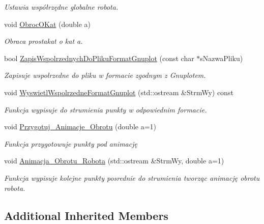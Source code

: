 \begin{DoxyCompactItemize}
\begin{DoxyCompactList}\small\item\em Ustawia współrzędne globalne robota. \end{DoxyCompactList}\item 
void \hyperlink{class_robot_a4d5ca83fe9dee72eddd8c6df97a0e10d}{Obroc\+O\+Kat} (double a)
\begin{DoxyCompactList}\small\item\em Obraca prostakat o kat a. \end{DoxyCompactList}\item 
bool \hyperlink{class_robot_a8e9a1014f600141e9a9514d6622b3394}{Zapis\+Wspolrzednych\+Do\+Pliku\+Format\+Gnuplot} (const char $\ast$s\+Nazwa\+Pliku)
\begin{DoxyCompactList}\small\item\em Zapisuje wspolrzedne do pliku w formacie zgodnym z Gnuplotem. \end{DoxyCompactList}\item 
\hypertarget{class_robot_a1a73604f8395ef66e6bf1e470108a77e}{void \hyperlink{class_robot_a1a73604f8395ef66e6bf1e470108a77e}{Wyswietl\+Wspolrzedne\+Format\+Gnuplot} (std\+::ostream \&Strm\+Wy) const }\label{class_robot_a1a73604f8395ef66e6bf1e470108a77e}

\begin{DoxyCompactList}\small\item\em Funkcja wypisuje do strumienia punkty w odpowiednim formacie. \end{DoxyCompactList}\item 
void \hyperlink{class_robot_a6fd10be0da964daa94eb78bc7f02f879}{Przygotuj\+\_\+\+Animacje\+\_\+\+Obrotu} (double a=1)
\begin{DoxyCompactList}\small\item\em Funkcja przygotowuje punkty pod animację \end{DoxyCompactList}\item 
void \hyperlink{class_robot_a902a2c6e7e53d75b686a019a455916d8}{Animacja\+\_\+\+Obrotu\+\_\+\+Robota} (std\+::ostream \&Strm\+Wy, double a=1)
\begin{DoxyCompactList}\small\item\em Funkcja wypisuje kolejne punkty posrednie do strumienia tworząc animację obrotu robota. \end{DoxyCompactList}\end{DoxyCompactItemize}
\subsection*{Additional Inherited Members}


